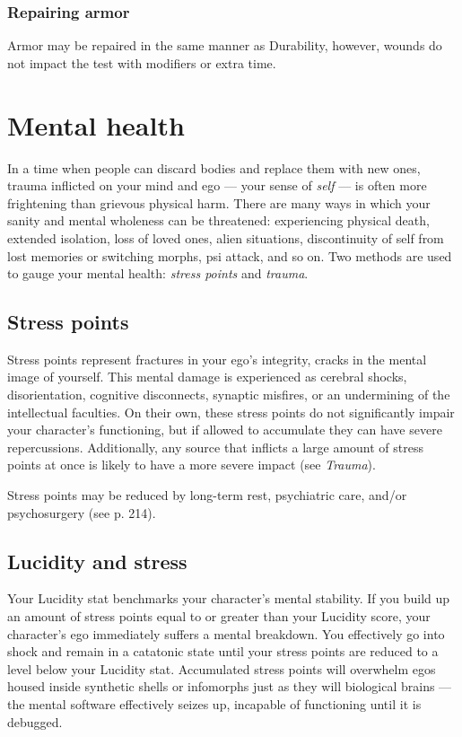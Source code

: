 \subsubsection{Repairing armor}

Armor may be repaired in the same manner as Durability, however, wounds do not impact the test with modifiers or extra time.

\section{Mental health}
\label{sec:mental-health}

In a time when people can discard bodies and replace them with new ones, trauma inflicted on your mind and ego --- your sense of \emph{self} --- is often more frightening than grievous physical harm. There are many ways in which your sanity and mental wholeness can be threatened: experiencing physical death, extended isolation, loss of loved ones, alien situations, discontinuity of self from lost memories or switching morphs, psi attack, and so on. Two methods are used to gauge your mental health: \emph{stress points} and \emph{trauma}.


\subsection{Stress points}
\label{sec:stress-points}

Stress points represent fractures in your ego’s integrity, cracks in the mental image of yourself. This mental damage is experienced as cerebral shocks, disorientation, cognitive disconnects, synaptic misfires, or an undermining of the intellectual faculties. On their own, these stress points do not significantly impair your character’s functioning, but if allowed to accumulate they can have severe repercussions. Additionally, any source that inflicts a large amount of stress points at once is likely to have a more severe impact (see \emph{Trauma}).

Stress points may be reduced by long-term rest, psychiatric care, and/or psychosurgery (see p. 214).


\subsection{Lucidity and stress}
\label{sec:lucidity-stress}

Your Lucidity stat benchmarks your character’s mental stability. If you build up an amount of stress points equal to or greater than your Lucidity score, your character’s ego immediately suffers a mental breakdown. You effectively go into shock and remain in a catatonic state until your stress points are reduced to a level below your Lucidity stat. Accumulated stress points will overwhelm egos housed inside synthetic shells or infomorphs just as they will biological brains --- the mental software effectively seizes up, incapable of functioning until it is debugged.

